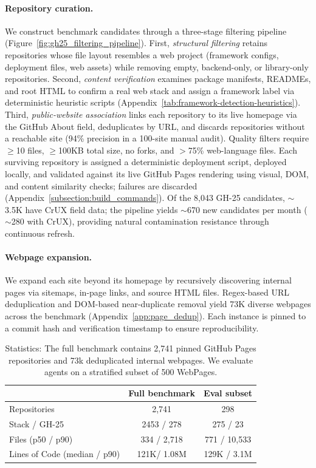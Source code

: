 \paragraph{Repository curation.}
We construct benchmark candidates through a three-stage filtering pipeline (Figure~\ref{fig:gh25_filtering_pipeline}). First, \emph{structural filtering} retains repositories whose file layout resembles a web project (framework configs, deployment files, web assets) while removing empty, backend-only, or library-only repositories. Second, \emph{content verification} examines package manifests, READMEs, and root HTML to confirm a real web stack and assign a framework label via deterministic heuristic scripts (Appendix~\ref{tab:framework-detection-heuristics}). Third, \emph{public-website association} links each repository to its live homepage via the GitHub About field, deduplicates by URL, and discards repositories without a reachable site (94\% precision in a 100-site manual audit). Quality filters require $\geq$10 files, $\geq$100KB total size, no forks, and $>$75\% web-language files. Each surviving repository is assigned a deterministic deployment script, deployed locally, and validated against its live GitHub Pages rendering using visual, DOM, and content similarity checks; failures are discarded (Appendix~\ref{subsection:build_commands}). Of the 8{,}043 GH-25 candidates, ${\sim}$3.5K have CrUX field data; the pipeline yields ${\sim}$670 new candidates per month (${\sim}$280 with CrUX), providing natural contamination resistance through continuous refresh.

\paragraph{Webpage expansion.}
We expand each site beyond its homepage by recursively discovering internal pages via sitemaps, in-page links, and source HTML files. Regex-based URL deduplication and DOM-based near-duplicate removal yield 73K diverse webpages across the benchmark (Appendix~\ref{app:page_dedup}). Each instance is pinned to a commit hash and verification timestamp to ensure reproducibility.

\begin{table}[t]
\centering
\small
\begin{tabular}{lcc}
\hline
 & \textbf{Full benchmark} & \textbf{Eval subset} \\
\hline
Repositories & 2{,}741 & 298 \\
Stack / GH-25 & 2453 / 278& 275 / 23\\
Files (p50 / p90) & 334 / 2{,}718 & 771 / 10{,}533 \\
Lines of Code (median / p90) & 121K/ 1.08M & 129K / 3.1M \\
\hline
\end{tabular}
\caption{\OurBench Statistics: The full benchmark contains 2,741 pinned GitHub Pages repositories and 73k deduplicated internal webpages. We evaluate agents on a stratified subset of 500 WebPages.}
\label{tab:bench_stats}
\end{table}

